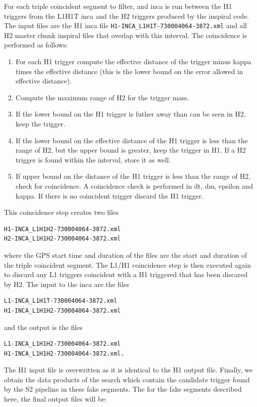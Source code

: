 For each triple coincident segment to filter, and inca is run between the H1
triggers from the L1H1T inca and the H2 triggers produced by the inspiral
code. The input files are the H1 inca file \verb|H1-INCA_L1H1T-730004064-3872.xml|
and all H2 master chunk inspiral files that overlap with this interval. The
coincidence is performed as follows:
\begin{enumerate}
\item For each H1 trigger compute the effective distance of the trigger minus
kappa times the effective distance (this is the lower bound on the error
allowed in effective distance).

\item Compute the maximum range of H2 for the trigger mass.

\item If the lower bound on the H1 trigger is futher away than can be seen in
H2, keep the trigger.

\item If the lower bound on the effective distance of the H1 trigger is less
than the range of H2, but the upper bound is greater, keep the trigger in H1.
If a H2 trigger is found within the interval, store it as well.

\item If upper bound on the distance of the H1 trigger is less than the range
of H2, check for coincidence. A coincidence check is performed in dt, dm,
epsilon and kappa. If there is no coincident trigger discard the H1 trigger.
\end{enumerate}
This coincidence step creates two files
\begin{verbatim}
H1-INCA_L1H1H2-730004064-3872.xml
H2-INCA_L1H1H2-730004064-3872.xml
\end{verbatim}
where the GPS start time and duration of the files are the start and duration
of the triple coincident segment.  The L1/H1 coincidence step is then executed
again to discard any L1 triggers coincident with a H1 triggered that has been
discared by H2. The input to the inca are the files
\begin{verbatim}
L1-INCA_L1H1T-730004064-3872.xml
H1-INCA_L1H1H2-730004064-3872.xml
\end{verbatim}
and the output is the files
\begin{verbatim}
L1-INCA_L1H1H2-730004064-3872.xml
H1-INCA_L1H1H2-730004064-3872.xml.
\end{verbatim}
The H1 input file is overwritten as it is identical to the H1 output file.
Finally, we obtain the data products of the search which contain the candidate
trigger found by the S2 pipeline in these fake segments. The for the fake
segments described here, the final output files will be:

